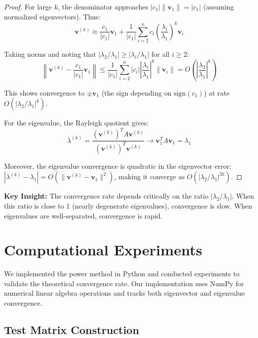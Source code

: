 \documentclass[11pt,a4paper]{article}
\begin{document}
\begin{proof}
For large $k$, the denominator approaches $|c_1| \|\mathbf{v}_1\| = |c_1|$ (assuming normalized eigenvectors). Thus:
\begin{equation}
\mathbf{v}^{(k)} \approx \frac{c_1}{|c_1|} \mathbf{v}_1 + \frac{1}{|c_1|}\sum_{i=2}^n c_i \left(\frac{\lambda_i}{\lambda_1}\right)^k \mathbf{v}_i
\end{equation}

Taking norms and noting that $|\lambda_2/\lambda_1| \geq |\lambda_i/\lambda_1|$ for all $i \geq 2$:
\begin{equation}
\left\|\mathbf{v}^{(k)} - \frac{c_1}{|c_1|}\mathbf{v}_1\right\| \leq \frac{1}{|c_1|}\sum_{i=2}^n |c_i| \left|\frac{\lambda_i}{\lambda_1}\right|^k \|\mathbf{v}_i\| = O\left(\left|\frac{\lambda_2}{\lambda_1}\right|^k\right)
\end{equation}

This shows convergence to $\pm \mathbf{v}_1$ (the sign depending on $\text{sign}(c_1)$) at rate $O(|\lambda_2/\lambda_1|^k)$.

For the eigenvalue, the Rayleigh quotient gives:
\begin{equation}
\lambda^{(k)} = \frac{(\mathbf{v}^{(k)})^T A \mathbf{v}^{(k)}}{(\mathbf{v}^{(k)})^T \mathbf{v}^{(k)}} \to \mathbf{v}_1^T A \mathbf{v}_1 = \lambda_1
\end{equation}

Moreover, the eigenvalue convergence is quadratic in the eigenvector error: $|\lambda^{(k)} - \lambda_1| = O(\|\mathbf{v}^{(k)} - \mathbf{v}_1\|^2)$, making it converge as $O(|\lambda_2/\lambda_1|^{2k})$.
\end{proof}

\textbf{Key Insight:} The convergence rate depends critically on the ratio $|\lambda_2/\lambda_1|$. When this ratio is close to 1 (nearly degenerate eigenvalues), convergence is slow. When eigenvalues are well-separated, convergence is rapid.

\section{Computational Experiments}
\label{sec:experiments}

We implemented the power method in Python and conducted experiments to validate the theoretical convergence rate. Our implementation uses NumPy for numerical linear algebra operations and tracks both eigenvector and eigenvalue convergence.

\subsection{Test Matrix Construction}
\end{document}
